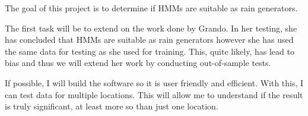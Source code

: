 The goal of this project is to determine if HMMs are suitable as rain generators.

The first task will be to extend on the work done by Grando. In her testing, she has concluded that HMMs are suitable as rain generators however she has used the same data for testing as she used for training.  This, quite likely,  has lead to bias and thus we will extend her work by conducting out-of-sample tests.

If possible, I will build the software so it is user friendly and efficient. With this,  I  can test data for multiple locations. This will allow me to understand if the result is truly significant, at least more so than just one location.